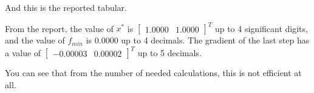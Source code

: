 \documentclass{article}
\begin{document}


And this is the reported tabular.



From the report, the value of $x^*$ is $\begin{bmatrix}
    1.0000 & 1.0000
\end{bmatrix}^T$ up to 4 significant digits, and the value of $f_{min}$ is $0.0000$ up to 4 decimals. The gradient of the last step has a value of $\begin{bmatrix}
    -0.00003 & 0.00002
\end{bmatrix}^T$ up to 5 decimals. 

You can see that from the number of needed calculations, this is not efficient at all.
\end{document}
